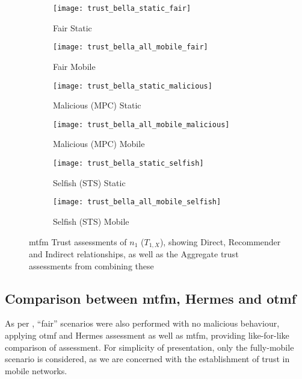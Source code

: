 \begin{figure}[h]
	\centering
	\begin{subfigure}{0.5\textwidth}
	\caption{Fair Static}
	\texttt{[image: trust\_bella\_static\_fair]} 
	\label{fig:trust_static}
	\end{subfigure}%
	\begin{subfigure}{0.5\textwidth}
	\caption{Fair Mobile}
	\texttt{[image: trust\_bella\_all\_mobile\_fair]}  
	\label{fig:trust_all_mobile}
	\end{subfigure}%
	
	\begin{subfigure}{0.5\textwidth}
	\caption{Malicious (MPC) Static}
	\texttt{[image: trust\_bella\_static\_malicious]} 
	\label{fig:trust_static_mal}
	\end{subfigure}%
	\begin{subfigure}{0.5\textwidth}
	\caption{Malicious (MPC) Mobile}
	\texttt{[image: trust\_bella\_all\_mobile\_malicious]}  
	\label{fig:trust_all_mobile_mal}
	\end{subfigure}%
	
	\begin{subfigure}{0.5\textwidth}
	\caption{Selfish (STS) Static}
	\texttt{[image: trust\_bella\_static\_selfish]}
	\label{fig:trust_static_sel}
	\end{subfigure}%
	\begin{subfigure}{0.5\textwidth}
	\caption{Selfish (STS) Mobile}
	\texttt{[image: trust\_bella\_all\_mobile\_selfish]}  \label{fig:trust_all_mobile_sel}
	\end{subfigure}%

	\caption{\gls{mtfm} Trust assessments of $n_1$ ($T_{1,X}$), showing Direct, Recommender and Indirect relationships, as well as the Aggregate trust assessments from combining these} 
	\label{fig:trust_mobility}
\end{figure}
%

\subsection{Comparison between \gls{mtfm}, Hermes and \gls{otmf}}
As per \cite{Guo11}, ``fair'' scenarios were also performed with no malicious behaviour, applying \gls{otmf} and Hermes assessment as well as \gls{mtfm}, providing like-for-like comparison of assessment.
For simplicity of presentation, only the fully-mobile scenario is considered, as we are concerned with the establishment of trust in mobile networks.

